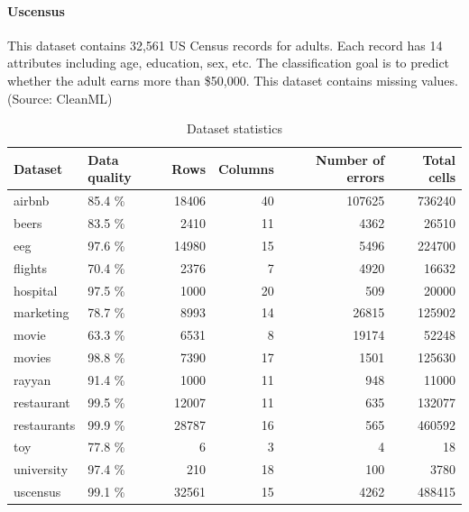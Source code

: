 \paragraph{Uscensus}
This dataset contains 32,561 US Census records
for adults. Each record has 14 attributes including age, education, sex, etc. The classification goal is to predict whether the adult earns more than \$50,000. This dataset contains missing values.
\\(Source: CleanML)


\begin{table}
\begin{tabular}{llrrrr}
\toprule
     Dataset & Data quality &   Rows &  Columns &  Number of errors &  Total cells \\
\midrule
      airbnb &       85.4 \% &  18406 &       40 &            107625 &       736240 \\
       beers &       83.5 \% &   2410 &       11 &              4362 &        26510 \\
         eeg &       97.6 \% &  14980 &       15 &              5496 &       224700 \\
     flights &       70.4 \% &   2376 &        7 &              4920 &        16632 \\
    hospital &       97.5 \% &   1000 &       20 &               509 &        20000 \\
   marketing &       78.7 \% &   8993 &       14 &             26815 &       125902 \\
       movie &       63.3 \% &   6531 &        8 &             19174 &        52248 \\
      movies &       98.8 \% &   7390 &       17 &              1501 &       125630 \\
      rayyan &       91.4 \% &   1000 &       11 &               948 &        11000 \\
  restaurant &       99.5 \% &  12007 &       11 &               635 &       132077 \\
 restaurants &       99.9 \% &  28787 &       16 &               565 &       460592 \\
         toy &       77.8 \% &      6 &        3 &                 4 &           18 \\
  university &       97.4 \% &    210 &       18 &               100 &         3780 \\
    uscensus &       99.1 \% &  32561 &       15 &              4262 &       488415 \\
\bottomrule
\end{tabular}
\caption{Dataset statistics}
\label{tab:dataset_statistics}
\end{table}

